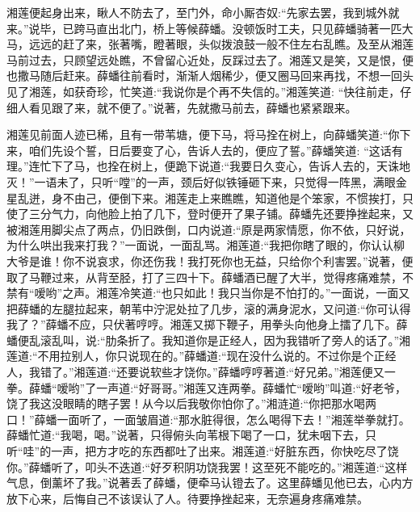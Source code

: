 \begin{parag}
    湘莲便起身出来，瞅人不防去了，至门外，命小厮杏奴:“先家去罢，我到城外就来。”说毕，已跨马直出北门，桥上等候薛蟠。没顿饭时工夫，只见薛蟠骑著一匹大马，远远的赶了来，张著嘴，瞪著眼，头似拨浪鼓一般不住左右乱瞧。及至从湘莲马前过去，只顾望远处瞧，不曾留心近处，反踩过去了。湘莲又是笑，又是恨，便也撒马随后赶来。薛蟠往前看时，渐渐人烟稀少，便又圈马回来再找，不想一回头见了湘莲，如获奇珍，忙笑道:“我说你是个再不失信的。”湘莲笑道: “快往前走，仔细人看见跟了来，就不便了。”说著，先就撒马前去，薛蟠也紧紧跟来。
\end{parag}


\begin{parag}
    湘莲见前面人迹已稀，且有一带苇塘，便下马，将马拴在树上，向薛蟠笑道:“你下来，咱们先设个誓，日后要变了心，告诉人去的，便应了誓。”薛蟠笑道: “这话有理。”连忙下了马，也拴在树上，便跪下说道:“我要日久变心，告诉人去的，天诛地灭！”一语未了，只听“嘡”的一声，颈后好似铁锤砸下来，只觉得一阵黑，满眼金星乱迸，身不由己，便倒下来。湘莲走上来瞧瞧，知道他是个笨家，不惯挨打，只使了三分气力，向他脸上拍了几下，登时便开了果子铺。薛蟠先还要挣挫起来，又被湘莲用脚尖点了两点，仍旧跌倒，口内说道:“原是两家情愿，你不依，只好说，为什么哄出我来打我？”一面说，一面乱骂。湘莲道:“我把你瞎了眼的，你认认柳大爷是谁！你不说哀求，你还伤我！我打死你也无益，只给你个利害罢。”说著，便取了马鞭过来，从背至胫，打了三四十下。薛蟠酒已醒了大半，觉得疼痛难禁，不禁有“嗳哟”之声。湘莲冷笑道:“也只如此！我只当你是不怕打的。”一面说，一面又把薛蟠的左腿拉起来，朝苇中泞泥处拉了几步，滚的满身泥水，又问道:“你可认得我了？”薛蟠不应，只伏著哼哼。湘莲又掷下鞭子，用拳头向他身上擂了几下。薛蟠便乱滚乱叫，说:“肋条折了。我知道你是正经人，因为我错听了旁人的话了。”湘莲道:“不用拉别人，你只说现在的。”薛蟠道:“现在没什么说的。不过你是个正经人，我错了。”湘莲道:“还要说软些才饶你。”薛蟠哼哼著道:“好兄弟。”湘莲便又一拳。薛蟠“嗳哟”了一声道:“好哥哥。”湘莲又连两拳。薛蟠忙“嗳哟”叫道:“好老爷，饶了我这没眼睛的瞎子罢！从今以后我敬你怕你了。”湘涟道:“你把那水喝两口！”薛蟠一面听了，一面皱眉道:“那水脏得很，怎么喝得下去！”湘莲举拳就打。薛蟠忙道:“我喝，喝。”说著，只得俯头向苇根下喝了一口，犹未咽下去，只听“哇”的一声，把方才吃的东西都吐了出来。湘莲道:“好脏东西，你快吃尽了饶你。”薛蟠听了，叩头不迭道:“好歹积阴功饶我罢！这至死不能吃的。”湘莲道:“这样气息，倒薰坏了我。”说著丢了薛蟠，便牵马认镫去了。这里薛蟠见他已去，心内方放下心来，后悔自己不该误认了人。待要挣挫起来，无奈遍身疼痛难禁。
\end{parag}


